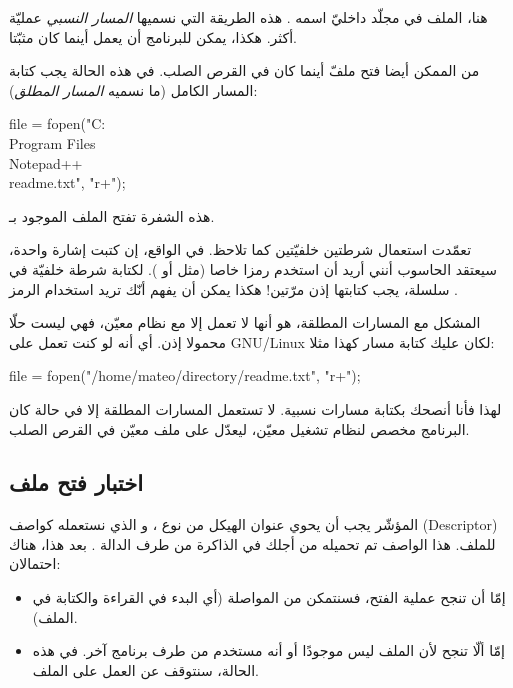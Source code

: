 هنا، الملف
في مجلّد  داخليّ اسمه
.
هذه الطريقة التي نسميها
\textit{المسار النسبي}
عمليّة أكثر. هكذا، يمكن للبرنامج أن يعمل أينما كان مثبّتا.

من الممكن أيضا فتح ملفّ أينما كان في القرص الصلب. في هذه الحالة يجب كتابة المسار الكامل (ما نسميه
\textit{المسار المطلق}):

\begin{Csource}
  file = fopen("C:\\Program Files\\Notepad++\\readme.txt", "r+");
\end{Csource}

هذه الشفرة تفتح الملف
الموجود بـ.

\begin{warning}
  تعمّدت استعمال شرطتين خلفيّتين
\InlineCode{\textbackslash}
  كما تلاحظ. في الواقع، إن كتبت إشارة واحدة، سيعتقد الحاسوب أنني أريد أن استخدم رمزا خاصا (مثل 
أو ).
لكتابة شرطة خلفيّة في سلسلة، يجب كتابتها إذن مرّتين! هكذا يمكن أن يفهم أنّك تريد استخدام الرمز
\InlineCode{\textbackslash}.
\end{warning}

المشكل مع المسارات المطلقة، هو أنها لا تعمل إلا مع نظام معيّن، فهي ليست حلّا محمولا إذن. أي أنه لو كنت تعمل على
\textenglish{GNU/Linux}
لكان عليك كتابة مسار كهذا مثلا:

\begin{Csource}
  file = fopen("/home/mateo/directory/readme.txt", "r+");
\end{Csource}

لهذا فأنا أنصحك بكتابة مسارات نسبية. لا تستعمل المسارات المطلقة إلا في حالة كان البرنامج مخصص لنظام تشغيل معيّن، ليعدّل على ملف معيّن في القرص الصلب.

\subsection{اختبار فتح ملف}
المؤشّر
يجب أن يحوي عنوان الهيكل من نوع
،
و الذي نستعمله كواصف
(\textenglish{Descriptor})
للملف. هذا الواصف تم تحميله من أجلك في الذاكرة من طرف الدالة
.
بعد هذا، هناك احتمالان:

\begin{itemize}
  \item إمّا أن تنجح عملية الفتح، فسنتمكن من المواصلة (أي البدء في القراءة والكتابة في الملف).
  \item إمّا ألّا تنجح لأن الملف ليس موجودًا أو أنه مستخدم من طرف برنامج آخر. في هذه الحالة، سنتوقف عن العمل على الملف.
\end{itemize}

